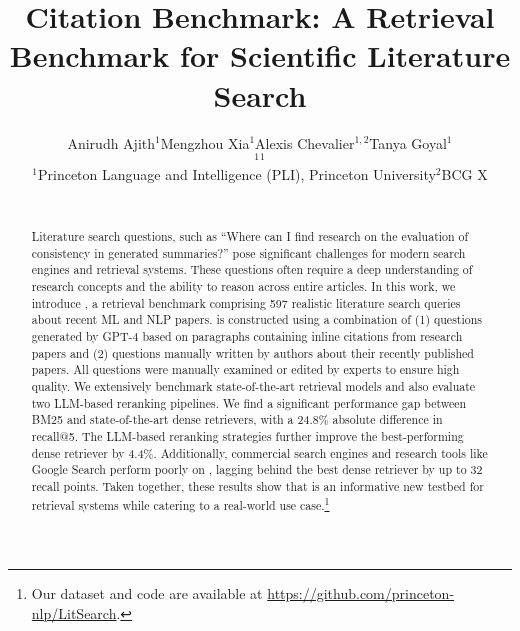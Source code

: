 \title{Citation Benchmark}
\title{\ours{}: A Retrieval Benchmark for Scientific Literature Search}

\author{Anirudh Ajith$^1$\quad Mengzhou Xia$^1$\quad Alexis Chevalier$^{1,2}$\quad Tanya Goyal$^1$\\$^1$\quad {}$^1$\\
$^1$Princeton Language and Intelligence (PLI), 
Princeton University\quad $^2$BCG X\\
\\
}


\maketitle

\begin{abstract}

Literature search questions, such as ``{Where can I find research on the evaluation of consistency in generated summaries?}'' pose significant challenges for modern search engines and retrieval systems. These questions often require a deep understanding of research concepts and the ability to reason across entire articles. In this work, we introduce \emph{\ours{}}, a retrieval benchmark comprising 597 realistic literature search queries about recent ML and NLP papers. \ours{} is constructed using a combination of (1) questions generated by GPT-4 based on paragraphs containing inline citations from research papers and 
(2)  questions manually written by authors about their recently published papers. 
All \ours{} questions were manually examined or edited by experts to ensure high quality. We extensively benchmark state-of-the-art retrieval models and also evaluate two LLM-based reranking pipelines.
We find a significant performance gap between BM25 and state-of-the-art dense retrievers, with a 24.8\% absolute difference in recall@5. The LLM-based reranking strategies further improve the best-performing dense retriever by 4.4\%. Additionally, commercial search engines and research tools like Google Search perform poorly on \ours{}, lagging behind the best dense retriever by up to 32 recall points. Taken together, these results show that \ours{} is an informative new testbed for retrieval systems while catering to a real-world use case.\footnote{Our dataset and code are available at \url{https://github.com/princeton-nlp/LitSearch}.}

\end{abstract}

